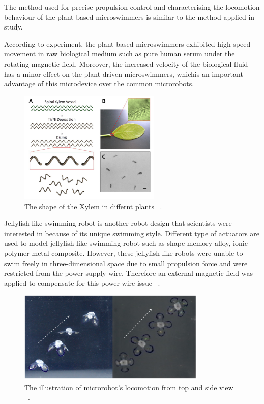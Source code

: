 \documentclass[a4paper,11pt]{article}
\begin{document}
\begin{sloppypar}
The method used for precise propulsion control and characterising the locomotion behaviour of the 
plant-based microswimmers is similar to the method applied in \citeauthor{gao2013bioinspired} study.

According to \citeauthor{gao2013bioinspired} experiment, the plant-based 
microswimmers exhibited high speed movement in raw biological medium such as 
pure human serum under the rotating magnetic field. Moreover, the increased velocity of the 
biological fluid has a minor effect on the plant-driven microswimmers, whichis an important 
advantage of this microdevice over the common microrobots.


\begin{figure}
  \centering
    \includegraphics[width=0.6\textwidth]{plants2}
  \caption{The shape of the Xylem in differnt plants ~\citep{gao2013bioinspired}.}
  \label{plants2}
\end{figure}



Jellyfish-like swimming robot is another robot design that scientists were interested 
in because of its unique swimming style. Different type of actuators are used to model
 jellyfish-like swimming robot such as shape memory alloy, ionic polymer metal 
composite. However, these jellyfish-like robots were unable to swim freely in 
three-dimensional space due to small propulsion force and were restricted from
 the power supply wire. Therefore an external magnetic field was applied to compensate 
for this power wire issue ~\citep{ko2012jellyfish}.

\begin{figure}
  \centering
    \includegraphics[width=0.8\textwidth]{jellyfish}
  \caption{ The illustration of microrobot\rq{}s locomotion from top and side view ~\citep{ko2012jellyfish}.}
  \label{jellyfish}
\end{figure}


\end{sloppypar}
\end{document}
